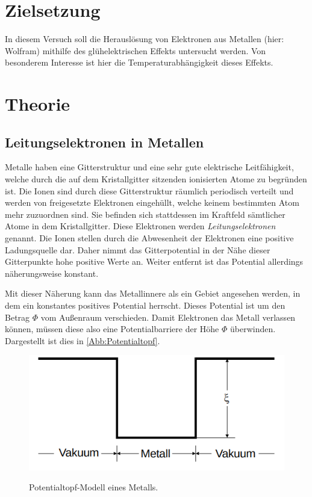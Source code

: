 \section{Zielsetzung}
\label{sec:Zielsetzung}

In diesem Versuch soll die Herauslösung von Elektronen aus Metallen (hier: Wolfram)
mithilfe des glühelektrischen Effekts untersucht werden. Von besonderem Interesse
ist hier die Temperaturabhängigkeit dieses Effekts.

\section{Theorie}
\label{sec:Theorie}

\subsection{Leitungselektronen in Metallen}

Metalle haben eine Gitterstruktur und eine sehr gute 
elektrische Leitfähigkeit, welche durch die auf dem 
Kristallgitter sitzenden ionisierten Atome zu begründen
ist.
Die Ionen sind durch diese Gitterstruktur räumlich
periodisch verteilt und werden von freigesetzte Elektronen
eingehüllt, welche keinem bestimmten Atom mehr zuzuordnen
sind. Sie befinden sich stattdessen im Kraftfeld sämtlicher
Atome in dem Kristallgitter.
Diese Elektronen werden \textit{Leitungselektronen} genannt.
Die Ionen stellen durch die Abwesenheit der Elektronen
eine positive Ladungsquelle dar. Daher nimmt das Gitterpotential
in der Nähe dieser Gitterpunkte hohe positive Werte an.
Weiter entfernt ist das Potential allerdings näherungsweise
konstant.

Mit dieser Näherung kann das Metallinnere als ein Gebiet
angesehen werden, in dem ein konstantes positives Potential
herrscht. Dieses Potential ist um den Betrag $\Phi$
vom Außenraum verschieden. Damit Elektronen das Metall
verlassen können, müssen diese also eine Potentialbarriere
der Höhe $\Phi$ überwinden. Dargestellt ist dies 
in \autoref{Abb:Potentialtopf}.\\

\begin{figure}[H]
    \centering
    
    \caption{Potentialtopf-Modell eines Metalls.\cite{sample}}
    \includegraphics[width=\textwidth]{Bilder/Potentialtopf.png}
    \label{Abb:Potentialtopf}
\end{figure}

